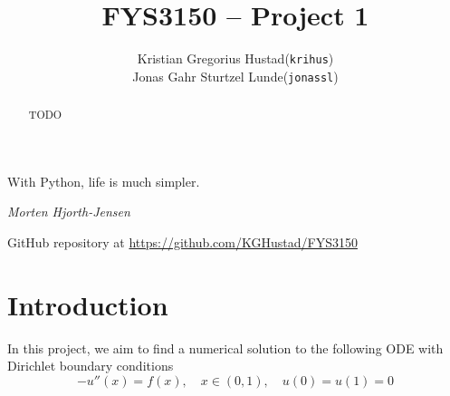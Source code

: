 \documentclass[a4paper]{article}
\begin{document}
\title{FYS3150 -- Project 1}
\author{
    \begin{tabular}{r l}
        Kristian Gregorius Hustad & (\texttt{krihus})\\
        Jonas Gahr Sturtzel Lunde & (\texttt{jonassl})
    \end{tabular}}

\maketitle



\setlength{\epigraphwidth}{0.75\textwidth}
\renewcommand{\epigraphflush}{center}
\renewcommand{\beforeepigraphskip}{50pt}
\renewcommand{\afterepigraphskip}{100pt}
\renewcommand{\epigraphsize}{\normalsize}

\epigraph{With Python, life is much simpler.}{\textit{Morten Hjorth-Jensen}}

\begin{abstract}
TODO
\end{abstract}

\vfill


\begin{center}
    GitHub repository at \url{https://github.com/KGHustad/FYS3150}
\end{center}

\newpage

\newcommand{\half}{\frac{1}{2}}
\newcommand{\dx}{{\Delta x}}
\newcommand{\bigO}{{\mathcal{O}}}



\section{Introduction}\label{sec:intro}

In this project, we aim to find a numerical solution to the following ODE with Dirichlet boundary conditions
\begin{equation}
    -u''(x) = f(x), \quad x\in(0,1), \quad u(0) = u(1) = 0
    \label{eq:ddu_dxx_cont}
\end{equation}
\end{document}
